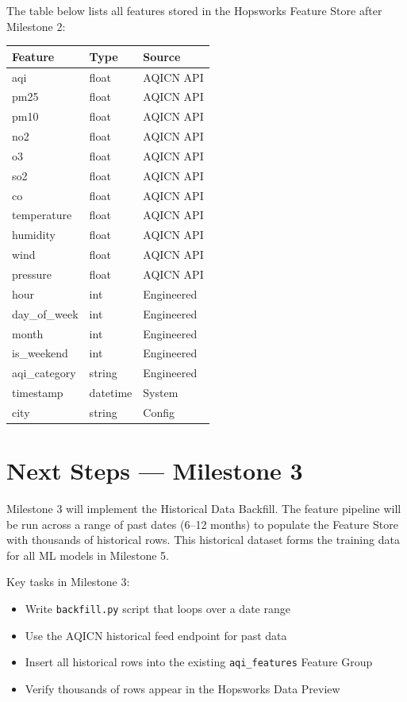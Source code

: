 \documentclass[conference]{IEEEtran}
\begin{document}
The table below lists all features stored in the Hopsworks Feature Store after Milestone 2:

\begin{center}
\begin{tabular}{|l|l|l|}
\hline
\textbf{Feature} & \textbf{Type} & \textbf{Source} \\
\hline
aqi & float & AQICN API \\
pm25 & float & AQICN API \\
pm10 & float & AQICN API \\
no2 & float & AQICN API \\
o3 & float & AQICN API \\
so2 & float & AQICN API \\
co & float & AQICN API \\
temperature & float & AQICN API \\
humidity & float & AQICN API \\
wind & float & AQICN API \\
pressure & float & AQICN API \\
hour & int & Engineered \\
day\_of\_week & int & Engineered \\
month & int & Engineered \\
is\_weekend & int & Engineered \\
aqi\_category & string & Engineered \\
timestamp & datetime & System \\
city & string & Config \\
\hline
\end{tabular}
\end{center}

\section{Next Steps — Milestone 3}

Milestone 3 will implement the Historical Data Backfill. The feature pipeline will be run across a range of past dates (6--12 months) to populate the Feature Store with thousands of historical rows. This historical dataset forms the training data for all ML models in Milestone 5.

Key tasks in Milestone 3:
\begin{itemize}[leftmargin=1.5em, itemsep=2pt]
    \item Write \texttt{backfill.py} script that loops over a date range
    \item Use the AQICN historical feed endpoint for past data
    \item Insert all historical rows into the existing \texttt{aqi\_features} Feature Group
    \item Verify thousands of rows appear in the Hopsworks Data Preview
\end{itemize}
\end{document}
